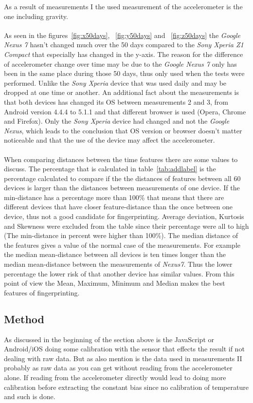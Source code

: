 As a result of measurements I the used measurement of the accelerometer is the one including gravity. \\
\\
As seen in the figures~\ref{fig:x50days}, ~\ref{fig:y50days} and ~\ref{fig:z50days} the \textit{Google Nexus 7} hasn't changed much over the 50 days compared to the \textit{Sony Xperia Z1 Compact} that especially has changed in the y-axis. The reason for the difference of accelerometer change over time may be due to the \textit{Google Nexus 7} only has been in the same place during those 50 days, thus only used when the tests were performed. Unlike the \textit{Sony Xperia} device that was used daily and may be dropped at one time or another. An additional fact about the measurements is that both devices has changed its OS between measurements 2 and 3, from Android version 4.4.4 to 5.1.1 and that different browser is used (Opera, Chrome and Firefox). Only the \textit{Sony Xperia} device had changed and not the \textit{Google Nexus}, which leads to the conclusion that OS version or browser doesn't matter noticeable and that the use of the device may affect the accelerometer.\\
\\
When comparing distances between the time features there are some values to discuss. The percentage that is calculated in table~\ref{tab:addlabel} is the percentage calculated to compare if the the distances of features between all 60 devices is larger than the distances between measurements of one device. If the min-distance has a percentage more than 100\% that means that there are different devices that have closer feature-distance than the once between one device, thus not a good candidate for fingerprinting. Average deviation, Kurtosis and Skewness were excluded from the table since their percentage were all to high (The min-distance in percent were higher than 100\%). The median distance of the features gives a value of the normal case of the measurements. For example the median mean-distance between all devices is ten times longer than the median mean-distance between the measurements of \textit{Nexus7}. Thus the lower percentage the lower risk of that another device has similar values. From this point of view the Mean, Maximum, Minimum and Median makes the best features of fingerprinting.

\subsection{Method}
As discussed in the beginning of the section above is the JavaScript or Android/iOS doing some calibration with the sensor that effects the result if not dealing with raw data. But as also mention is the data used in measurements II probably as raw data as you can get without reading from the accelerometer alone. If reading from the accelerometer directly would lead to doing more calibration before extracting the constant bias since no calibration of temperature and such is done.

